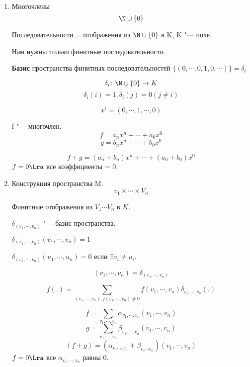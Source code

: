 \begin{exmp}
    \begin{enumerate}
    \item Многочлены
     $$\N \cup \{0\}$$

     Последовательности = отображения из $\N \cup \{0\}$ в K, K "--- поле. 

     Нам нужны только финитные последовательности. 
     
     \textbf{Базис} пространства финитных последовательностей $\{(0,\cdots, 0, 1, 0, \cdots)\} = \delta_i$
     
     $$\delta_i\colon \N\cup\{0\} \to K$$
     $$\delta_i(i) = 1, \delta_i(j) = 0(j \ne i)$$

     $$x^i = (0, \cdots, 1, \cdots, 0)$$

     f "--- многочлен. 
     $$f = a_nx^n + \cdots + a_0x^0$$
     $$g = b_nx^n + \cdots + b_0x^0$$

     $$f + g = (a_n + b_n)x^n + \cdots +(a_0 + b_0)x^0$$
     $f = 0 \Lra$ все коэффициенты = 0. 

    \item Конструкция пространства M.
    $$v_1 \times \cdots \times V_n$$

    Финитные отображения из $V_1 \cdots V_n$ в $K$.

    $\delta_{(v_1, \cdots, v_n)}$ "--- базис пространства. 
    
    $\delta_{(v_1, \cdots, v_n)}(v_1, \cdots, v_n) = 1$
    
    $\delta_{(v_1, \cdots, v_n)}(u_1, \cdots, u_n) = 0$ если $\exists v_i \ne u_i$.

    $$(v_1, \cdots, v_n) = \delta_{(v_1, \cdots, v_n)}$$
    
    $$f(.) = \sum_{(v_1, \cdots, v_n), f(v_1, \cdots, v_n) \ne 0} f(v_1, \cdots, v_n)\delta_{v_1, \cdots, v_n}(.)$$ 

    $$f = \sum_{v_1, \cdots, v_n}\alpha_{v_1, \cdots, v_n}(v_1, \cdots, v_n)$$
    $$g = \sum_{v_1, \cdots, v_n}\beta_{v_1, \cdots, v_n}(v_1, \cdots, v_n)$$
    $$(f + g) = (\alpha_{v_1 \cdots, v_n} + \beta_{v_1 \cdots v_n})(v_1, \cdots, v_n)$$
    $f = 0 \Lra$  все $\alpha_{v_1, \cdots, v_n}$  равны 0.
    \end{enumerate}
\end{exmp}
